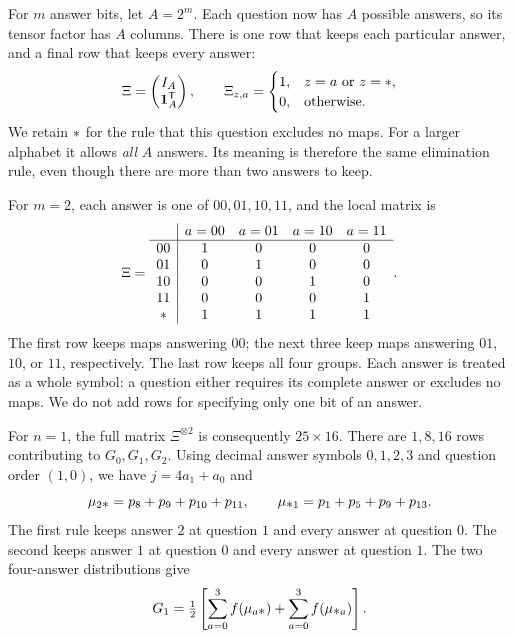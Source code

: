 \documentclass[11pt]{article}
\newcommand{\wild}{\mathord{\text{\normalsize$\ast$}}}
\begin{document}
For $m$ answer bits, let $A=2^m$. Each question now has $A$ possible answers,
so its tensor factor has $A$ columns. There is one row that keeps each
particular answer, and a final row that keeps every answer:
\begin{equation}\label{eq:Xi-alphabet}
  \Xi=\begin{pmatrix}I_A\\\mathbf1_A^{\mathsf T}\end{pmatrix},
  \qquad
  \Xi_{z,a}=\begin{cases}
    1,&z=a\text{ or }z=\wild,\\
    0,&\text{otherwise}.
  \end{cases}
\end{equation}
We retain $\wild$ for the rule that this question excludes no maps.
For a larger alphabet it allows \emph{all} $A$ answers. Its meaning is
therefore the same elimination rule, even though there are more than two
answers to keep.

\begin{example}
For $m=2$, each answer is one of $00,01,10,11$, and the local matrix is
\begin{equation}\label{eq:Xi-m2}
  \Xi=
  \begin{array}{c|cccc}
    &a=00&a=01&a=10&a=11\\ \hline
    00&1&0&0&0\\
    01&0&1&0&0\\
    10&0&0&1&0\\
    11&0&0&0&1\\
    \wild&1&1&1&1
  \end{array}.
\end{equation}
The first row keeps maps answering $00$; the next three keep maps answering
$01$, $10$, or $11$, respectively. The last row keeps all four groups.
Each answer is treated as a whole symbol: a question either requires its
complete answer or excludes no maps. We do not add rows for specifying
only one bit of an answer.

For $n=1$, the full matrix $\Xi^{\otimes2}$ is consequently $25\times16$.
There are $1,8,16$ rows contributing to $G_0,G_1,G_2$. Using decimal answer
symbols $0,1,2,3$ and question order $(1,0)$, we have $j=4a_1+a_0$ and
\begin{equation*}
  \mu_{2\wild}=p_8+p_9+p_{10}+p_{11},
  \qquad \mu_{\wild1}=p_1+p_5+p_9+p_{13}.
\end{equation*}
The first rule keeps answer $2$ at question $1$ and every answer at
question $0$. The second keeps answer $1$ at question $0$ and every answer
at question $1$. The two four-answer distributions give
\begin{equation*}
  G_1=\tfrac12\left[\sum_{a=0}^3f(\mu_{a\wild})
                         +\sum_{a=0}^3f(\mu_{\wild a})\right].
\end{equation*}
\end{example}
\end{document}
